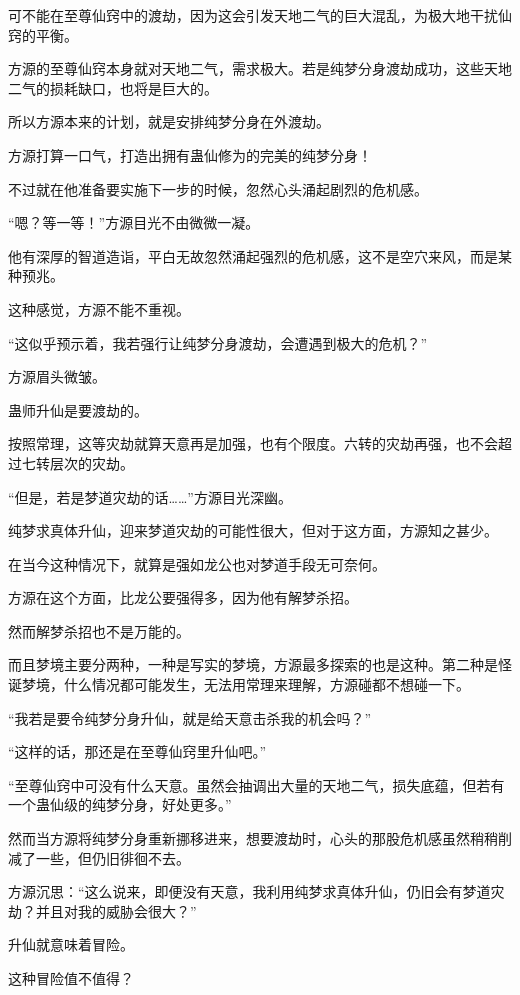 \begin{this_body}
可不能在至尊仙窍中的渡劫，因为这会引发天地二气的巨大混乱，为极大地干扰仙窍的平衡。

方源的至尊仙窍本身就对天地二气，需求极大。若是纯梦分身渡劫成功，这些天地二气的损耗缺口，也将是巨大的。

所以方源本来的计划，就是安排纯梦分身在外渡劫。

方源打算一口气，打造出拥有蛊仙修为的完美的纯梦分身！

不过就在他准备要实施下一步的时候，忽然心头涌起剧烈的危机感。

“嗯？等一等！”方源目光不由微微一凝。

他有深厚的智道造诣，平白无故忽然涌起强烈的危机感，这不是空穴来风，而是某种预兆。

这种感觉，方源不能不重视。

“这似乎预示着，我若强行让纯梦分身渡劫，会遭遇到极大的危机？”

方源眉头微皱。

蛊师升仙是要渡劫的。

按照常理，这等灾劫就算天意再是加强，也有个限度。六转的灾劫再强，也不会超过七转层次的灾劫。

“但是，若是梦道灾劫的话……”方源目光深幽。

纯梦求真体升仙，迎来梦道灾劫的可能性很大，但对于这方面，方源知之甚少。

在当今这种情况下，就算是强如龙公也对梦道手段无可奈何。

方源在这个方面，比龙公要强得多，因为他有解梦杀招。

然而解梦杀招也不是万能的。

而且梦境主要分两种，一种是写实的梦境，方源最多探索的也是这种。第二种是怪诞梦境，什么情况都可能发生，无法用常理来理解，方源碰都不想碰一下。

“我若是要令纯梦分身升仙，就是给天意击杀我的机会吗？”

“这样的话，那还是在至尊仙窍里升仙吧。”

“至尊仙窍中可没有什么天意。虽然会抽调出大量的天地二气，损失底蕴，但若有一个蛊仙级的纯梦分身，好处更多。”

然而当方源将纯梦分身重新挪移进来，想要渡劫时，心头的那股危机感虽然稍稍削减了一些，但仍旧徘徊不去。

方源沉思：“这么说来，即便没有天意，我利用纯梦求真体升仙，仍旧会有梦道灾劫？并且对我的威胁会很大？”

升仙就意味着冒险。

这种冒险值不值得？


\end{this_body}
